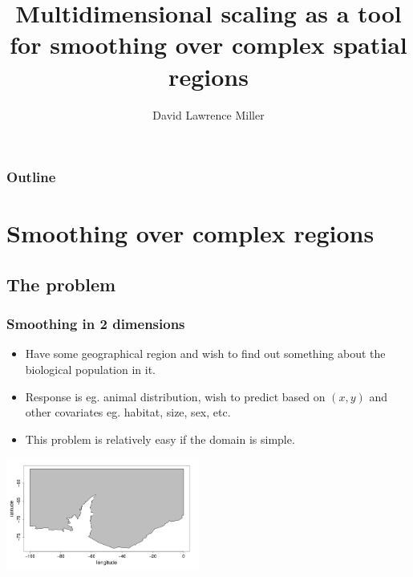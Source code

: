 \documentclass[ignorenonframetext]{beamer} %
\title[Smoothing over complex regions]{Multidimensional scaling as a tool for smoothing over complex spatial regions}
\author[Miller]{David Lawrence Miller}
\institute{Mathematical Sciences\\University of Bath}
\newcommand{\bc}{\begin{center}}
\newcommand{\ec}{\end{center}}
\newcommand{\bi}{\begin{itemize}}
\newcommand{\ei}{\end{itemize}}
\begin{document}
\begin{frame}
  \titlepage
\end{frame}


 {
\begin{frame}
  \frametitle{Outline}
  \tableofcontents %
\end{frame}
}

\section{Smoothing over complex regions}

\subsection{The problem}

\begin{frame}
	\frametitle{Smoothing in 2 dimensions}
       \bi
         \item Have some geographical region and wish to find out something about the biological population in it. 
         \item Response is eg. animal distribution, wish to predict based on $(x,y)$ and other covariates eg. habitat, size, sex, etc.
         \item This problem is relatively easy if the domain is simple.
       \ei
       \bc
         \includegraphics[width=2.5in]{figs/peninsula.png}
       \ec
\end{frame}
\end{document}
